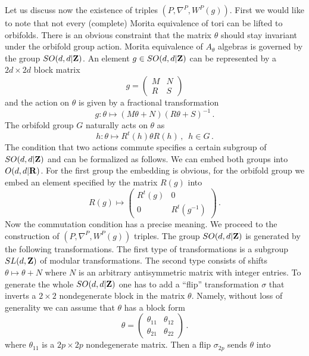\documentclass[a4paper,a4paper]{article}
\begin{document}
{Let us discuss now the existence of triples $(P,  \nabla^{P},W^{P}(g) )$. 
First we would like to note that not every (complete) Morita equivalence of tori can be lifted 
to orbifolds. There is an obvious constraint that the matrix $\theta$ should stay invariant under the orbifold 
group action. Morita equivalence of $A_{\theta}$ algebras is governed by the group $SO(d,d|{\bf Z})$. 
An element $g\in SO(d,d|{\bf Z})$ can be represented by a $2d\times 2d$ block matrix 
$$
g=\left( 
\begin{array}{cc}
M&N\\
R&S
\end{array}
\right)
$$
and the action on $\theta$ is given by a fractional transformation
\begin{equation}\label{fractr}
g: \theta \mapsto (M\theta + N)(R\theta + S)^{-1} \, .
\end{equation}
The orbifold group $G$ naturally acts on $\theta$ as 
$$
h: \theta \mapsto R^{t}(h) \theta R(h) \, , \enspace h\in G \, .
$$
The condition that two actions commute specifies a certain subgroup of $SO(d,d|{\bf Z})$ and 
can be  formalized as follows. We can embed both groups into $O(d,d|{\bf R})$. For the 
first group the embedding is obvious, for the orbifold group we embed an element specified by the matrix $R(g)$ 
into 
$$
R(g) \mapsto \left( 
\begin{array}{cc}
R^{t}(g)&0\\
0&R^{t}(g^{-1})
\end{array}
\right) \, .
$$  
Now the commutation condition has a precise meaning. We proceed to the construction of  $(P,  \nabla^{P},W^{P}(g) )$ triples. 
The group $SO(d,d|{\bf Z})$ is generated by the following transformations. 
The first type of transformations is a subgroup $SL(d,{\bf Z})$ of modular transformations. The second type consists 
of shifts $\theta \mapsto \theta + N$ where $N$ is an arbitrary antisymmetric matrix with integer entries. 
To generate the whole  $SO(d,d|{\bf Z})$  one has to  add a ``flip'' transformation $\sigma$ that inverts 
a $2\times2$ nondegenerate block in the matrix $\theta$. Namely, without loss of generality we can assume that 
$\theta$ has a block form
$$
\theta = \left( 
\begin{array}{cc}
\theta_{11}&\theta_{12}\\
\theta_{21}&\theta_{22}
\end{array}
\right) \, .
$$  
where $\theta_{11}$ is a $2p\times 2p$ nondegenerate matrix. Then a flip $\sigma_{2p}$ sends $\theta$ into 
\begin{equation} \label{flip}

\end{equation}}
\end{document}

